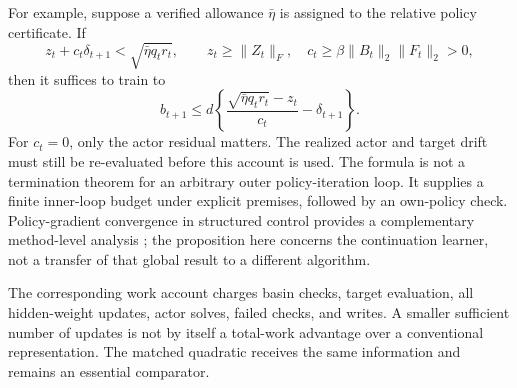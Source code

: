 For example, suppose a verified allowance $\bar\eta$ is assigned to the
relative policy certificate. If
\[
 z_t+c_t\delta_{t+1}<\sqrt{\bar\eta q_t r_t},\qquad
 z_t\geq\|Z_t\|_F,\quad
 c_t\geq\beta\|B_t\|_2\|F_t\|_2>0,
\]
then it suffices to train to
\begin{equation}
 b_{t+1}\leq d\left\{
 \frac{\sqrt{\bar\eta q_t r_t}-z_t}{c_t}-\delta_{t+1}\right\}.
 \label{eq:r24allocated}
\end{equation}
For $c_t=0$, only the actor residual matters. The realized actor and target
drift must still be re-evaluated before this account is used. The formula
is not a termination theorem for an arbitrary outer policy-iteration loop.
It supplies a finite inner-loop budget under explicit premises, followed
by an own-policy check. Policy-gradient convergence in structured control
provides a complementary method-level analysis
\citep{r24fazel2018}; the proposition here concerns the continuation learner,
not a transfer of that global result to a different algorithm.

The corresponding work account charges basin checks, target evaluation,
all hidden-weight updates, actor solves, failed checks, and writes. A smaller
sufficient number of updates is not by itself a total-work advantage over
a conventional representation. The matched quadratic receives the same
information and remains an essential comparator.
